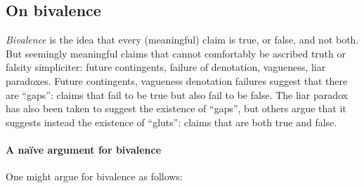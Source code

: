 \documentclass[../../../include/open-logic-section]{subfiles}
\begin{document}


\subsection{On bivalence}

\emph{Bivalence} is the idea that every (meaningful) claim is true, or false, and not both. But seemingly meaningful claims that cannot comfortably be ascribed truth or falsity simpliciter: future contingents, failure of denotation, vagueness, liar paradoxes. Future contingents, vagueness denotation failures suggest that there are ``gaps'': claims that fail to be true but also fail to be false. The liar paradox has also been taken to suggest the existence of ``gaps'', but others argue that it suggests instead the existence of ``gluts'': claims that are both true and false. 





\paragraph{A naïve argument for bivalence} One might argue for bivalence as follows:
\end{document}
